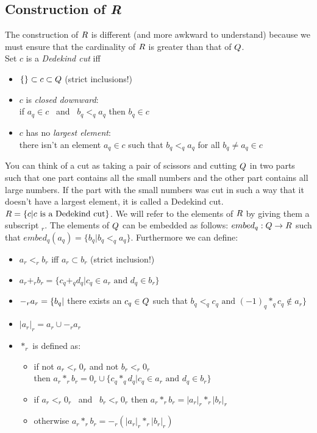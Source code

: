 \subsection{Construction of \sl R}

The construction of $R$ is different (and more awkward to understand) because
we must ensure that the cardinality of $R$ is greater than that of $Q$. \\
Set $c$ is a {\em Dedekind cut} iff
\begin{itemize}
\item $\{\} \subset c \subset Q$ (strict inclusions!)
\item $c$ is {\em closed downward}: \\
      if $a_q \in c$ \mbox{ and } $b_q <_q a_q$ then $b_q \in c$
\item $c$ has no {\em largest element}: \\
      there isn't an element $a_q \in c$ such that $b_q <_q a_q$ for all $b_q
      \neq a_q \in c$
\end{itemize}
You can think of a cut as taking a pair of scissors and cutting $Q$ in two
parts such that one part contains all the small numbers and the other part
contains all large numbers. If the part with the small numbers was cut in such
a way that it doesn't have a largest element, it is called a Dedekind cut.
$R = \{c | c \mbox{ is a Dedekind cut}\}$. We will refer to the elements of
$R$ by giving them a subscript $_r$. The elements of $Q$ can be embedded as
follows: $embed_q: Q \rightarrow R$ such that $embed_q(a_q) = \{b_q | b_q
<_q a_q\}$. Furthermore we can define:
\begin{itemize}
\item $a_r <_r b_r$ iff $a_r \subset b_r$ (strict inclusion!)
\item $a_r +_r b_r = \{c_q +_q d_q | c_q \in a_r \mbox{ and } d_q \in b_r\}$
\item $-_r a_r = \\
      \{b_q |$ there exists an $c_q \in Q$ such that $b_q <_q c_q \mbox{ and
      } (-1)_q *_q c_q \not\in a_r\}$
\item $|a_r|_r = a_r \cup -_r a_r$
\item $*_r$ is defined as:
      \begin{itemize}
      \item if not $a_r <_r 0_r$ and not $b_r <_r 0_r$ \\ then $a_r *_r b_r =
            0_r \cup \{c_q *_q d_q | c_q \in a_r \mbox{ and } d_q \in b_r\}$
      \item if $a_r <_r 0_r$ \mbox{ and } $b_r <_r 0_r$ then $a_r *_r b_r =
            |a_r|_r *_r |b_r|_r$
      \item otherwise $a_r *_r b_r = -_r (|a_r|_r *_r |b_r|_r)$
  \end{itemize}
\end{itemize}

